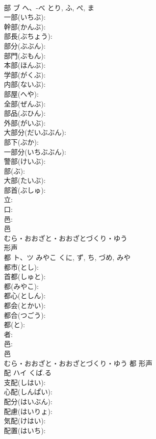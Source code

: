 \documentclass[8pt]{extreport}
\begin{document}
\begin{CJK}{UTF8}{min}
\\	部	ブ	へ、-べ	とり, ふ, ぺ, ま	
\\	一部(いちぶ): 
\\	幹部(かんぶ): 
\\	部長(ぶちょう): 
\\	部分(ぶぶん): 
\\	部門(ぶもん): 
\\	本部(ほんぶ): 
\\	学部(がくぶ): 
\\	内部(ないぶ): 
\\	部屋(へや): 
\\	全部(ぜんぶ): 
\\	部品(ぶひん): 
\\	外部(がいぶ): 
\\	大部分(だいぶぶん): 
\\	部下(ぶか): 
\\	一部分(いちぶぶん): 
\\	警部(けいぶ): 
\\	部(ぶ): 
\\	大部(たいぶ): 
\\	部首(ぶしゅ): 
\\	立: 
\\	口: 
\\	邑: 
\\	邑	
\\	むら・おおざと・おおざとづくり・ゆう	
\\	形声 
\\	都	ト、ツ	みやこ	くに, ず, ち, づめ, みや	
\\	都市(とし): 
\\	首都(しゅと): 
\\	都(みやこ): 
\\	都心(としん): 
\\	都会(とかい): 
\\	都合(つごう): 
\\	都(と): 
\\	者: 
\\	邑: 
\\	邑	
\\	むら・おおざと・おおざとづくり・ゆう	都	形声 
\\	配	ハイ	くば.る		
\\	支配(しはい): 
\\	心配(しんぱい): 
\\	配分(はいぶん): 
\\	配慮(はいりょ): 
\\	気配(けはい): 
\\	配置(はいち): 

\end{CJK}
\end{document}

